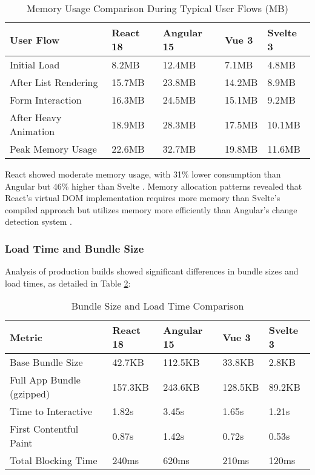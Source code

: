 \begin{table}[H]
\caption{Memory Usage Comparison During Typical User Flows (MB)}
\label{tab:memory-usage}
\centering
\begin{tabularx}{\textwidth}{lXXXX}
\toprule
\textbf{User Flow} & \textbf{React 18} & \textbf{Angular 15} & \textbf{Vue 3} & \textbf{Svelte 3} \\
\midrule
Initial Load & 8.2MB & 12.4MB & 7.1MB & 4.8MB \\
After List Rendering & 15.7MB & 23.8MB & 14.2MB & 8.9MB \\
Form Interaction & 16.3MB & 24.5MB & 15.1MB & 9.2MB \\
After Heavy Animation & 18.9MB & 28.3MB & 17.5MB & 10.1MB \\
Peak Memory Usage & 22.6MB & 32.7MB & 19.8MB & 11.6MB \\
\bottomrule
\end{tabularx}
\end{table}

React showed moderate memory usage, with 31\% lower consumption than Angular but 46\% higher than Svelte \cite{chen2022}. Memory allocation patterns revealed that React's virtual DOM implementation requires more memory than Svelte's compiled approach but utilizes memory more efficiently than Angular's change detection system \cite{muller2020}.

\subsubsection{Load Time and Bundle Size}
Analysis of production builds showed significant differences in bundle sizes and load times, as detailed in Table \ref{tab:bundle-size}:

\begin{table}[H]
\caption{Bundle Size and Load Time Comparison}
\label{tab:bundle-size}
\centering
\begin{tabularx}{\textwidth}{lXXXX}
\toprule
\textbf{Metric} & \textbf{React 18} & \textbf{Angular 15} & \textbf{Vue 3} & \textbf{Svelte 3} \\
\midrule
Base Bundle Size & 42.7KB & 112.5KB & 33.8KB & 2.8KB \\
Full App Bundle (gzipped) & 157.3KB & 243.6KB & 128.5KB & 89.2KB \\
Time to Interactive & 1.82s & 3.45s & 1.65s & 1.21s \\
First Contentful Paint & 0.87s & 1.42s & 0.72s & 0.53s \\
Total Blocking Time & 240ms & 620ms & 210ms & 120ms \\
\bottomrule
\end{tabularx}
\end{table}

